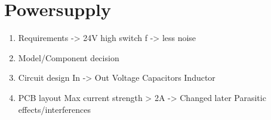 \section{Powersupply}

\begin{enumerate}
  \item Requirements
   -> 24V
  \subitem high switch f -> less noise
  \item Model/Component decision
  \item Circuit design
  \subitem In -> Out Voltage
  \subitem Capacitors
  \subitem Inductor
  \item PCB layout
  \subitem Max current strength
  \subsubitem > 2A -> Changed later
  \subitem Parasitic effects/interferences
\end{enumerate}